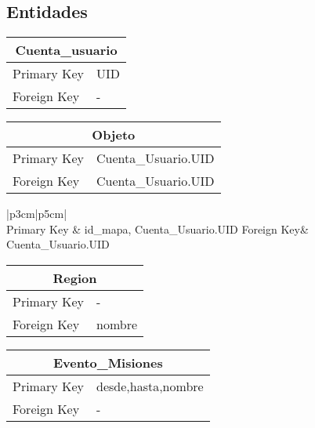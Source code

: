 \documentclass{report}
\begin{document}
\subsection{Entidades}

\begin{center}    
    \begin{tabular}{|p{3cm}|p{5cm}|}
    \hline
    \multicolumn{2}{|c|}{Cuenta_usuario} \\ 
    \hline
    \hline
    Primary Key& UID\\ 
    \hline
    Foreign Key & -\\ 
    \hline
    \end{tabular}
\end{center}

\begin{center}    
    \begin{tabular}{|p{3cm}|p{5cm}|}
    \hline
    \multicolumn{2}{|c|}{Objeto} \\ 
    \hline
    \hline
    Primary Key& Cuenta\_Usuario.UID\\ 
    \hline
    Foreign Key& Cuenta\_Usuario.UID\\ 
    \hline
    \end{tabular}
\end{center}

\begin{center}    
    \begin{tabular}{|p{3cm}|p{5cm}|}
    \hline
     \\ 
    \hline
    \hline
    Primary Key & id\_mapa, Cuenta_Usuario.UID
    \hline
    Foreign Key& Cuenta_Usuario.UID\\ 
    \hline
    \end{tabular}
\end{center}

\begin{center}    
    \begin{tabular}{|p{3cm}|p{5cm}|}
    \hline
    \multicolumn{2}{|c|}{Region} \\ 
    \hline
    \hline
    Primary Key& -\\ 
    \hline
    Foreign Key& nombre\\ 
    \hline
    \end{tabular}
\end{center}
\newpage
\begin{center}    
    \begin{tabular}{|p{3cm}|p{5cm}|}
    \multicolumn{2}{|c|}{Evento\_Misiones} \\ 
    \hline
    \hline
    Primary Key& desde,hasta,nombre\\ 
    \hline
    Foreign Key &-\\ 
    \hline
    \end{tabular}
\end{center}
\end{document}
